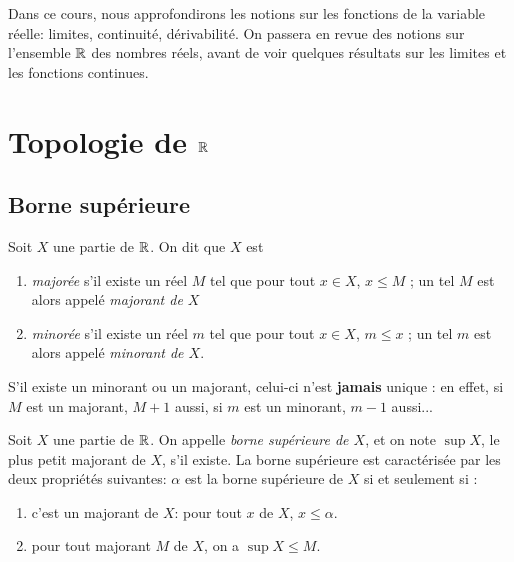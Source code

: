 \documentclass[../main.tex]{subfiles}
\begin{document}

    Dans ce cours, nous approfondirons les notions sur les fonctions de la variable réelle: limites, continuité, dérivabilité. On passera en revue des notions sur l'ensemble $\mathbb R$ des nombres réels, avant de voir quelques résultats sur les limites et les fonctions continues.


\section{Topologie de $\mathbb R$}

\subsection{Borne supérieure}

\begin{mydef}
Soit $X$ une partie de $\mathbb R$. On dit que $X$ est\begin{enumerate}
\item \textit{majorée} s'il existe un réel $M$ tel que pour tout $x\in X$, $x\leq M$ ; un tel $M$ est alors appelé \textit{majorant de $X$}
\item \textit{minorée} s'il existe un réel $m$ tel que pour tout $x\in X$, $m \leq x$ ; un tel $m$ est alors appelé \textit{minorant de $X$}.
\end{enumerate}
\end{mydef}

\begin{rem}
S'il existe un minorant ou un majorant, celui-ci n'est \textbf{jamais} unique : en effet, si $M$ est un majorant, $M+1$ aussi, si $m$ est un minorant, $m-1$ aussi...
\end{rem}

\begin{mydef}\label{defsup}
    Soit $X$ une partie de $\mathbb R$. On appelle \textit{borne supérieure de $X$}, et on note $\sup X$, le plus petit majorant de $X$, s'il existe. La borne supérieure est caractérisée par les deux propriétés suivantes: $\alpha$ est la borne supérieure de $X$ si et seulement si :\begin{enumerate}
        \item c'est un majorant de $X$: pour tout $x$ de $X$, $x\leq \alpha$.
        \item pour tout majorant $M$ de $X$, on a $\sup X\leq M$.
    \end{enumerate}
\end{mydef}
\end{document}
